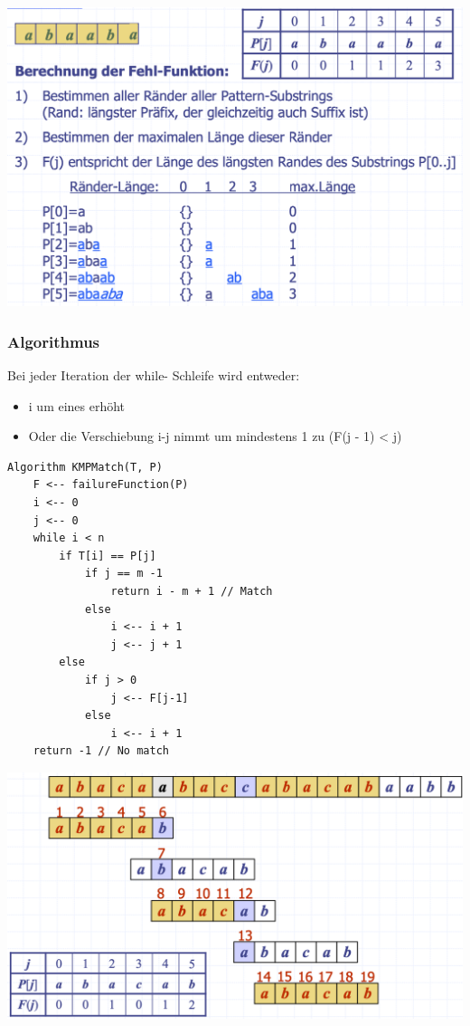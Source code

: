 \vspace{-8pt}
\begin{center}
    \includegraphics[scale=.25]{graphic/08 PatternMatching/KMP Fehl2.png}
\end{center}
\vspace{-8pt}

\subsubsection{Algorithmus}
Bei jeder Iteration der while- Schleife wird entweder:
\begin{itemize}
    \item i um eines erhöht
    \item Oder die Verschiebung i-j nimmt um mindestens 1 zu (F(j - 1) < j)
\end{itemize}
\begin{lstlisting}
Algorithm KMPMatch(T, P)
    F <-- failureFunction(P)
    i <-- 0
    j <-- 0
    while i < n
        if T[i] == P[j]
            if j == m -1
                return i - m + 1 // Match
            else
                i <-- i + 1
                j <-- j + 1
        else
            if j > 0
                j <-- F[j-1]
            else
                i <-- i + 1
    return -1 // No match
\end{lstlisting}
\vspace{-8pt}
\begin{center}
    \includegraphics[scale=.2]{graphic/08 PatternMatching/KMP.png}
\end{center}
\vspace{-8pt}

